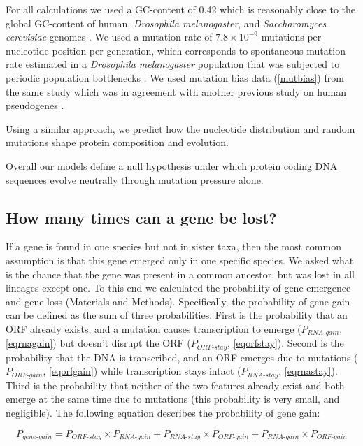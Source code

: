 \documentclass[12pt,a4paper]{article}
\begin{document}
For all calculations we used a GC-content of 0.42 which is reasonably close to the global GC-content of human, \textit{Drosophila melanogaster}, and \textit{Saccharomyces cerevisiae} genomes \citep{allgccontents, bionumbers}. We used a mutation rate of $7.8\times10^{-9}$ mutations per nucleotide position per generation, which corresponds to spontaneous mutation rate estimated in a \textit{Drosophila melanogaster} population that was subjected to periodic population bottlenecks \cite[mutation accumulation line,][]{drosophilamutrate}. We used mutation bias data (\autoref{mutbias}) from the same study \citep{drosophilamutrate} which was in agreement with another previous study on human pseudogenes \citep{humanmutrate}.

Using a similar approach, we predict how the nucleotide distribution and random mutations shape protein composition and evolution. 

Overall our models define a null hypothesis under which protein coding DNA sequences evolve neutrally through mutation pressure alone.

\subsection{How many times can a gene be lost?}

If a gene is found in one species but not in sister taxa, then the most common assumption is that this gene emerged only in one specific species. We asked what is the chance that the gene was present in a common ancestor, but was lost in all lineages except one. To this end we calculated the probability of gene emergence and gene loss (Materials and Methods). Specifically, the probability of gene gain can be defined as the sum of three probabilities. First is the probability that an ORF already exists, and a mutation causes transcription to emerge ($P_\textit{RNA-gain}$, \autoref{eqrnagain}) but doesn't disrupt the ORF ($P_\textit{ORF-stay}$, \autoref{eqorfstay}). Second is the probability that the DNA is transcribed, and an ORF emerges due to mutations ($P_\textit{ORF-gain}$, \autoref{eqorfgain}) while transcription stays intact ($P_\textit{RNA-stay}$, \autoref{eqrnastay}). Third is the probability that neither of the two features already exist and both emerge at the same time due to mutations (this probability is very small, and negligible). The following equation describes the probability of gene gain:

\begin{equation}
P_\textit{gene-gain} = P_\textit{ORF-stay}\times P_\textit{RNA-gain} + P_\textit{RNA-stay}\times P_\textit{ORF-gain} + P_\textit{RNA-gain}\times P_\textit{ORF-gain}
\label{genegaineq}
\end{equation}
\end{document}
